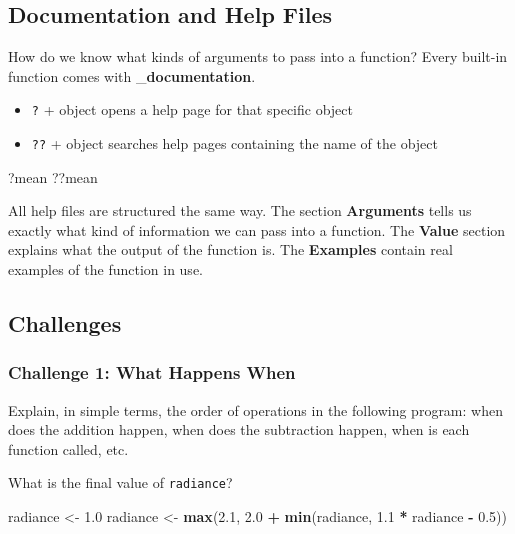 \documentclass[]{book}
\newenvironment{Shaded}{\begin{snugshade}}{\end{snugshade}}
\newcommand{\KeywordTok}[1]{\textcolor[rgb]{0.13,0.29,0.53}{\textbf{#1}}}
\newcommand{\FloatTok}[1]{\textcolor[rgb]{0.00,0.00,0.81}{#1}}
\newcommand{\StringTok}[1]{\textcolor[rgb]{0.31,0.60,0.02}{#1}}
\newcommand{\OperatorTok}[1]{\textcolor[rgb]{0.81,0.36,0.00}{\textbf{#1}}}
\newcommand{\NormalTok}[1]{#1}
\providecommand{\tightlist}{%
  \setlength{\itemsep}{0pt}\setlength{\parskip}{0pt}}
\begin{document}
\subsection{Documentation and Help
Files}\label{documentation-and-help-files}

How do we know what kinds of arguments to pass into a function? Every
built-in function comes with \_\textbf{documentation}.

\begin{itemize}
\tightlist
\item
  \texttt{?} + object opens a help page for that specific object
\item
  \texttt{??} + object searches help pages containing the name of the
  object
\end{itemize}

\begin{Shaded}
\begin{Highlighting}[]
\NormalTok{?mean}
\NormalTok{??mean}
\end{Highlighting}
\end{Shaded}

All help files are structured the same way. The section
\textbf{Arguments} tells us exactly what kind of information we can pass
into a function. The \textbf{Value} section explains what the output of
the function is. The \textbf{Examples} contain real examples of the
function in use.

\subsection{Challenges}\label{challenges-3}

\subsubsection*{Challenge 1: What Happens
When}\label{challenge-1-what-happens-when}

Explain, in simple terms, the order of operations in the following
program: when does the addition happen, when does the subtraction
happen, when is each function called, etc.

What is the final value of \texttt{radiance}?

\begin{Shaded}
\begin{Highlighting}[]
\NormalTok{radiance <-}\StringTok{ }\FloatTok{1.0}
\NormalTok{radiance <-}\StringTok{ }\KeywordTok{max}\NormalTok{(}\FloatTok{2.1}\NormalTok{, }\FloatTok{2.0} \OperatorTok{+}\StringTok{ }\KeywordTok{min}\NormalTok{(radiance, }\FloatTok{1.1} \OperatorTok{*}\StringTok{ }\NormalTok{radiance }\OperatorTok{-}\StringTok{ }\FloatTok{0.5}\NormalTok{))}
\end{Highlighting}
\end{Shaded}
\end{document}
